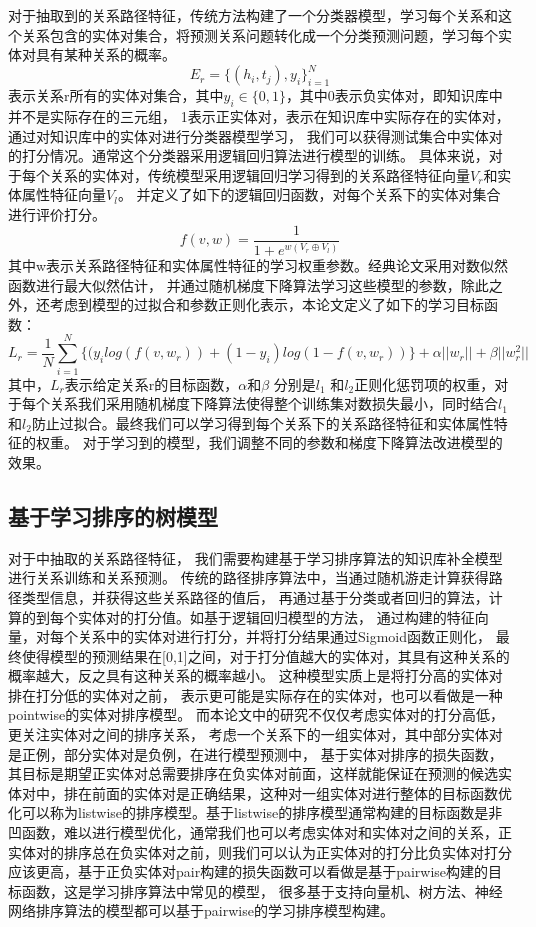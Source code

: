 对于抽取到的关系路径特征，传统方法构建了一个分类器模型，学习每个关系和这个关系包含的实体对集合，将预测关系问题转化成一个分类预测问题，学习每个实体对具有某种关系的概率。
$$E_r=\{(h_i,t_j),y_i\}^N_{i=1} $$
表示关系r所有的实体对集合，其中$y_i\in \{0,1\}$，其中0表示负实体对，即知识库中并不是实际存在的三元组，
1表示正实体对，表示在知识库中实际存在的实体对，通过对知识库中的实体对进行分类器模型学习，
我们可以获得测试集合中实体对的打分情况。通常这个分类器采用逻辑回归算法进行模型的训练。
具体来说，对于每个关系的实体对，传统模型采用逻辑回归学习得到的关系路径特征向量$V_r$和实体属性特征向量$V_l$。
并定义了如下的逻辑回归函数，对每个关系下的实体对集合进行评价打分。
$$f(v,w)=\frac{1}{1+e^{w(V_r \oplus V_l)}}$$
其中w表示关系路径特征和实体属性特征的学习权重参数。经典论文采用对数似然函数进行最大似然估计，
并通过随机梯度下降算法学习这些模型的参数，除此之外，还考虑到模型的过拟合和参数正则化表示，本论文定义了如下的学习目标函数：
$$L_r=\frac{1}{N}\sum_{i=1}^N \{(y_ilog(f(v,w_r)) + (1-y_i)log(1-f(v,w_r))\}+\alpha ||w_r||+\beta||w_r^2||$$
其中，$L_r$表示给定关系r的目标函数，$\alpha$和$\beta$ 分别是$l_1$ 和$l_2$正则化惩罚项的权重，对于每个关系我们采用随机梯度下降算法使得整个训练集对数损失最小，同时结合$l_1$ 和$l_2$防止过拟合。最终我们可以学习得到每个关系下的关系路径特征和实体属性特征的权重。
对于学习到的模型，我们调整不同的参数和梯度下降算法改进模型的效果。


\subsection{基于学习排序的树模型}
对于\label{sec:relational}中抽取的关系路径特征，
我们需要构建基于学习排序算法的知识库补全模型进行关系训练和关系预测。
传统的路径排序算法中，当通过随机游走计算获得路径类型信息，并获得这些关系路径的值后，
再通过基于分类或者回归的算法，计算的到每个实体对的打分值。如基于逻辑回归模型的方法，
通过构建的特征向量，对每个关系中的实体对进行打分，并将打分结果通过Sigmoid函数正则化，
最终使得模型的预测结果在[0,1]之间，对于打分值越大的实体对，其具有这种关系的概率越大，反之具有这种关系的概率越小。
这种模型实质上是将打分高的实体对排在打分低的实体对之前，
表示更可能是实际存在的实体对，也可以看做是一种pointwise的实体对排序模型。
而本论文中的研究不仅仅考虑实体对的打分高低，更关注实体对之间的排序关系，
考虑一个关系下的一组实体对，其中部分实体对是正例，部分实体对是负例，在进行模型预测中，
基于实体对排序的损失函数，其目标是期望正实体对总需要排序在负实体对前面，这样就能保证在预测的候选实体对中，排在前面的实体对是正确结果，这种对一组实体对进行整体的目标函数优化可以称为listwise的排序模型。基于listwise的排序模型通常构建的目标函数是非凹函数，难以进行模型优化，通常我们也可以考虑实体对和实体对之间的关系，正实体对的排序总在负实体对之前，则我们可以认为正实体对的打分比负实体对打分应该更高，基于正负实体对pair构建的损失函数可以看做是基于pairwise构建的目标函数，这是学习排序算法中常见的模型，
很多基于支持向量机、树方法、神经网络排序算法的模型都可以基于pairwise的学习排序模型构建。

